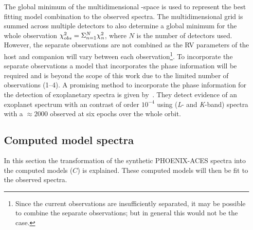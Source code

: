 The global minimum of the multidimensional \textchisquared-space is used to represent the best fitting model combination to the observed spectra.
The multidimensional \textchisquared{} grid is summed across multiple detectors to also determine a global minimum \textchisquared{} for the whole observation \({\chi}^{2}_{obs} = \Sigma^{N}_{n=1} {\chi}^{2}_n\), where \(N\) is the number of detectors used.
However, the separate observations are not combined as the {RV} parameters of the host and companion will vary between each observation\footnote{Since the current observations are insufficiently separated, it may be possible to combine the separate observations; but in general this would not be the case.}.
To incorporate the separate observations a model that incorporates the phase information will be required and is beyond the scope of this work due to the limited number of observations (1--4).
A promising method to incorporate the phase information for the detection of exoplanetary spectra is given by~\citet{lockwood_nearir_2014,piskorz_evidence_2016}.
They detect evidence of an exoplanet spectrum with an contrast of order \({10}^{-4}\) using \nir{} (\textit{L}- and \textit{K}-band) spectra with a \snr{}\(\approx2000\) observed at six epochs over the whole orbit.



\subsection{Computed model spectra}
\label{subsec:models}
In this section the transformation of the synthetic {PHOENIX-ACES} spectra into the computed models (\(C\)) is explained.
These computed models will then be fit to the observed spectra.

